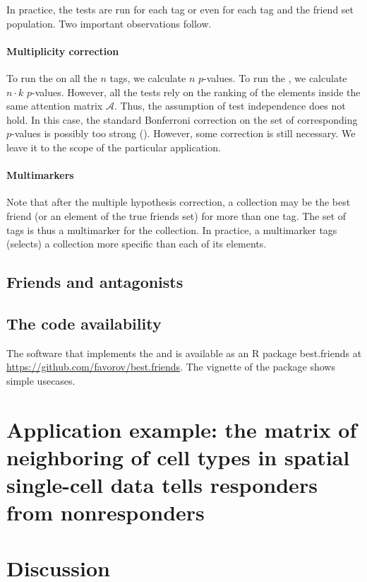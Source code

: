 \documentclass{llncs}
\begin{document}
In practice, the tests are run for each tag or even for each tag and the friend set population. Two important observations follow.

\paragraph*{Multiplicity correction} 
To run the  on all the $n$ tags, we 
calculate $n$ $p$-values. To run the , we calculate $n \cdot k$ $p$-values. However, all the tests rely on the ranking of the elements inside the same attention matrix $\mathcal{A}$. Thus, the assumption of test independence does not hold. In this case, the standard Bonferroni correction on the set of corresponding $p$-values is possibly too strong (\cite{cabin2000bonferroni}). However, some correction is still necessary. We leave it to the scope of the particular application.

\paragraph*{Multimarkers} Note that after the multiple hypothesis correction, a collection may be the best friend (or an element of the true friends set) for more than one tag. The set of tags is thus a multimarker for the collection. In practice, a multimarker tags (selects) a collection more specific than each of its elements.

\subsection{Friends and antagonists}

\subsection{The code availability}

The software that implements the  and  is available as an \textsf{R} package \textsf{best.friends} at 
\url{https://github.com/favorov/best.friends}. The vignette of the package shows simple usecases.

\section{Application example: the matrix of neighboring of cell types in spatial single-cell data tells responders from nonresponders}

\section{Discussion}
\end{document}
